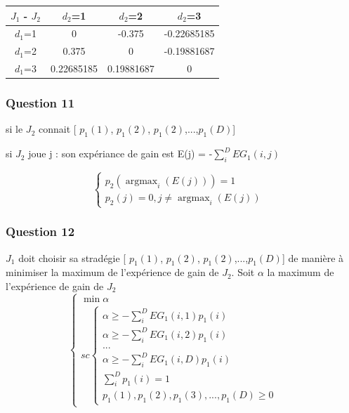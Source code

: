 \documentclass[12pt,a4paper]{article}
\begin{document}
\begin{tabular}{|c|c|c|c|}
\hline 
\(J_{1} \) - \(J_{2} \) &\(d_{2} \)=1 & \(d_{2} \)=2 &\(d_{2} \)=3\\
\hline  
\(d_{1} \)=1 & 0  &  -0.375  & -0.22685185 \\
\hline 
\(d_{1} \)=2 &  0.375  &  0  &  -0.19881687 \\
\hline 
\(d_{1} \)=3 &  0.22685185  &  0.19881687  &  0 \\
\hline 
\end{tabular}

\subsubsection{Question 11}

si le \(J_{2} \) connait [ \(p_{1}(1)\),  \(p_{1}(2)\),  \(p_{1}(2)\),...,\(p_{1}(D)\)]

si \(J_{2} \) joue j : son expériance de gain est  E(j) = -\(\sum\limits_{i}^{D}EG_{1}(i,j)\)

\begin{equation}\nonumber
\left\{
	\begin{array}{lr}
		p_{2}( \mathop{\arg\max}_{i}(E(j)) ) = 1 & \\
		p_{2}(j) = 0,j\neq\mathop{\arg\max}_{i}(E(j)) 
	\end{array}
\right.
\end{equation}


\subsubsection{Question 12}
\(J_{1} \) doit choisir sa stradégie   [ \(p_{1}(1)\),  \(p_{1}(2)\),  \(p_{1}(2)\),...,\(p_{1}(D)\)] de manière à minimiser la maximum de l'expérience de gain de  \(J_{2} \).
Soit  \(\alpha \)   la maximum de l'expérience de gain de  \(J_{2} \) 
\begin{equation}\nonumber
\left\{
	\begin{array}{lr}
		\min \alpha &\\
			sc\left\{
				\begin{array}{lr}
						\alpha \geq -\sum\limits_{i}^{D}EG_{1}(i,1)p_{1}(i)                   & \\
						\alpha \geq -\sum\limits_{i}^{D}EG_{1}(i,2)p_{1}(i)                   & \\
						...																														& \\
						\alpha \geq -\sum\limits_{i}^{D}EG_{1}(i,D)p_{1}(i)                  & \\
						\sum\limits_{i}^{D}p_{1}(i) = 1																& \\
						p_{1}(1),p_{1}(2),p_{1}(3),...,p_{1}(D) \geq 0
				\end{array}
		\right.
	\end{array}
\right.
\end{equation}


\printindex
\end{document}
